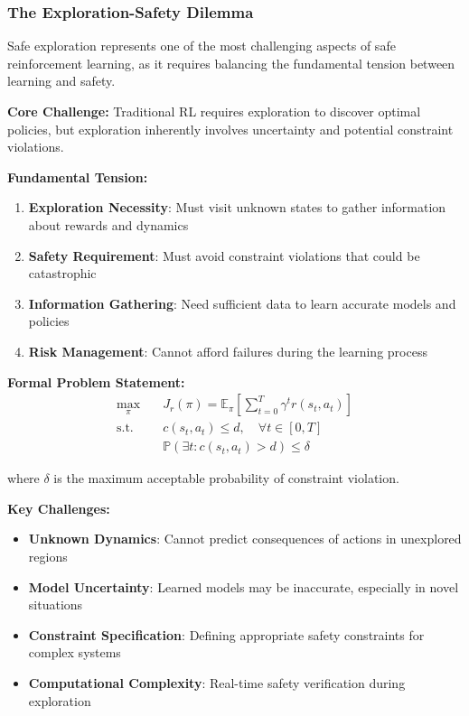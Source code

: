 \documentclass[12pt]{article}
\begin{document}
{{{{\subsubsection{The Exploration-Safety Dilemma}

Safe exploration represents one of the most challenging aspects of safe reinforcement learning, as it requires balancing the fundamental tension between learning and safety.

\textbf{Core Challenge:} Traditional RL requires exploration to discover optimal policies, but exploration inherently involves uncertainty and potential constraint violations.

\textbf{Fundamental Tension:}
\begin{enumerate}
\item \textbf{Exploration Necessity}: Must visit unknown states to gather information about rewards and dynamics
\item \textbf{Safety Requirement}: Must avoid constraint violations that could be catastrophic
\item \textbf{Information Gathering}: Need sufficient data to learn accurate models and policies
\item \textbf{Risk Management}: Cannot afford failures during the learning process
\end{enumerate}

\textbf{Formal Problem Statement:}
\begin{align}
\max_{\pi} \quad & J_r(\pi) = \mathbb{E}_\pi\left[\sum_{t=0}^{T} \gamma^t r(s_t, a_t)\right] \\
\text{s.t.} \quad & c(s_t, a_t) \leq d, \quad \forall t \in [0, T] \\
& \mathbb{P}(\exists t : c(s_t, a_t) > d) \leq \delta
\end{align}

where $\delta$ is the maximum acceptable probability of constraint violation.

\textbf{Key Challenges:}
\begin{itemize}
\item \textbf{Unknown Dynamics}: Cannot predict consequences of actions in unexplored regions
\item \textbf{Model Uncertainty}: Learned models may be inaccurate, especially in novel situations
\item \textbf{Constraint Specification}: Defining appropriate safety constraints for complex systems
\item \textbf{Computational Complexity}: Real-time safety verification during exploration
\end{itemize}

}}}}
\end{document}
